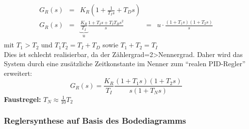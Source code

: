 \message{ !name(Mitschrieb_SysRegel.tex)}\documentclass[12pt,a4paper,ngerman]{scrartcl}
\begin{document}
\begin{align*}
  \begin{array}{lllll}
    G_R(s)&=&K_R(1+\frac{1}{T_Is}+T_Ds)\\
    G_R(s)&=&\underbrace{\frac{K_R}{T_I}}_{u}\frac{1+T_Is+T_IT_Bs^2}{s}&=&u\cdot \frac{(1+T_1s)(1+T_2s)}{s}
  \end{array}
\end{align*}
mit $T_1>T_2$ und $T_1T_2=T_I+T_D$ sowie $T_1+T_2=T_I$\\
Dies ist schlecht realisierbar, da der Zählergrad=2>Nennergrad. Daher wird das System durch eine zusätzliche Zeitkonstante im Nenner zum ``realen PID-Regler'' erweitert:
\[
G_R(s)=\frac{K_R}{T_I}\frac{(1+T_1s)(1+T_2s)}{s(1+T_Ns)}
\] 
\textbf{Faustregel:} $T_N \approx \frac{1}{10}T_2$


\subsubsection{Reglersynthese auf Basis des Bodediagramms}
\end{document}
